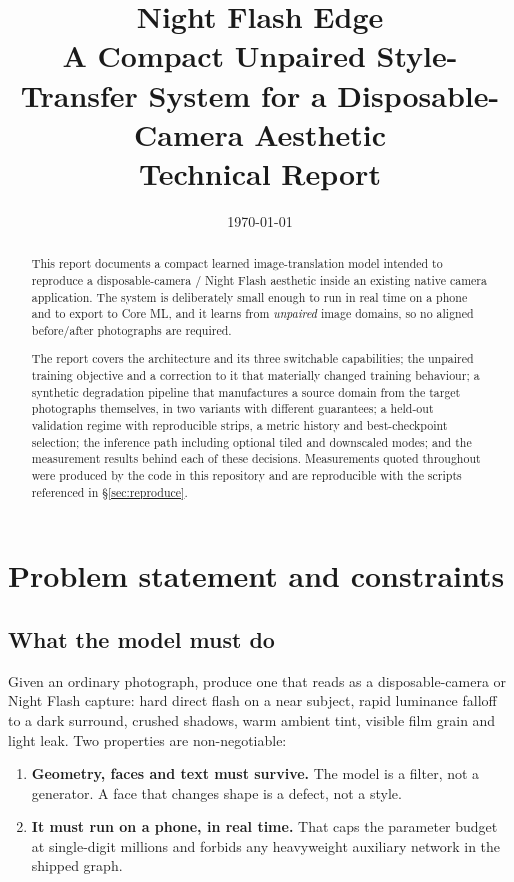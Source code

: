 \documentclass[11pt,a4paper]{article}
\title{\vspace{-2.5cm}\textbf{Night Flash Edge}\\[6pt]
\large A Compact Unpaired Style-Transfer System for a Disposable-Camera Aesthetic\\[4pt]
\large Technical Report}
\author{}
\date{\today}
\begin{document}
\maketitle
\vspace{-1.2cm}

\begin{abstract}
\noindent
This report documents a compact learned image-translation model intended to
reproduce a disposable-camera / Night Flash aesthetic inside an existing native
camera application. The system is deliberately small enough to run in real time on
a phone and to export to Core ML, and it learns from \emph{unpaired} image
domains, so no aligned before/after photographs are required.

The report covers the architecture and its three switchable capabilities; the
unpaired training objective and a correction to it that materially changed
training behaviour; a synthetic degradation pipeline that manufactures a source
domain from the target photographs themselves, in two variants with different
guarantees; a held-out validation regime with reproducible strips, a metric
history and best-checkpoint selection; the inference path including optional
tiled and downscaled modes; and the measurement results behind each of these
decisions. Measurements quoted throughout were produced by the code in this
repository and are reproducible with the scripts referenced in
\S\ref{sec:reproduce}.
\end{abstract}

\tableofcontents
\newpage

\section{Problem statement and constraints}

\subsection{What the model must do}

Given an ordinary photograph, produce one that reads as a disposable-camera or
Night Flash capture: hard direct flash on a near subject, rapid luminance falloff
to a dark surround, crushed shadows, warm ambient tint, visible film grain and
light leak. Two properties are non-negotiable:

\begin{enumerate}[leftmargin=1.4em]
  \item \textbf{Geometry, faces and text must survive.} The model is a filter,
        not a generator. A face that changes shape is a defect, not a style.
  \item \textbf{It must run on a phone, in real time.} That caps the parameter
        budget at single-digit millions and forbids any heavyweight auxiliary
        network in the shipped graph.
\end{enumerate}
\end{document}
